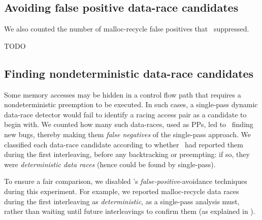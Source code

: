 %


\subsection{Avoiding false positive data-race candidates}
\label{sec:eval-falsepos}

We also counted the number of malloc-recycle false positives that \landslide~suppressed.

TODO


\subsection{Finding nondeterministic data-race candidates}
\label{sec:eval-falseneg}
Some memory accesses may be hidden in a control flow path that requires a nondeterministic preemption to be executed.
In such cases, a single-pass dynamic data-race detector
would fail
to identify a racing access pair as a candidate to begin with.
%
We counted how many such data-races, used as PPs, led to \quicksand~finding new bugs,
thereby making them {\em false negatives} of the single-pass approach.
We classified each data-race candidate according to whether \landslide~had reported them during the first interleaving, before any backtracking or preempting: if so, they were {\em deterministic data races} (hence could be found by single-pass).

To ensure a fair comparison, we disabled \landslide's {\em false-positive}-avoidance techniques during this experiment.
For example, we reported malloc-recycle data races during the first interleaving as {\em deterministic}, as a single-pass analysis must,
rather than waiting until future interleavings to confirm them (as explained in \sect{\ref{sec:recycle}}).


